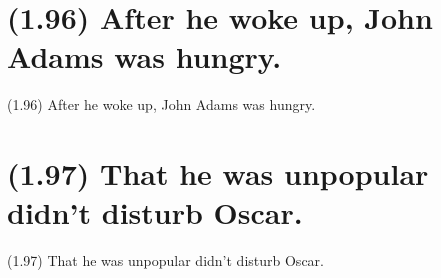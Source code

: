 \documentclass{article}
\begin{document}
\section*{(1.96) After he woke up, John Adams was hungry.}

\bigbreak
\begin{enumerate*}
\item[(1.96)] After he woke up, John Adams was hungry.
\end{enumerate*}
\bigbreak

\bigbreak
\begin{minipage}{\textwidth}
\end{minipage}
\bigbreak

\clearpage

%
%

\section*{(1.97) That he was unpopular didn't disturb Oscar.}

\bigbreak
\begin{enumerate*}
\item[(1.97)] That he was unpopular didn't disturb Oscar.
\end{enumerate*}
\bigbreak

\bigbreak
\begin{minipage}{\textwidth}
\end{minipage}
\bigbreak
\end{document}
